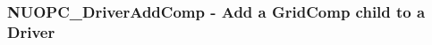  
\setlength{\oldparskip}{\parskip}
\setlength{\parskip}{1.5ex}
\setlength{\oldparindent}{\parindent}
\setlength{\parindent}{0pt}
\setlength{\oldbaselineskip}{\baselineskip}
\setlength{\baselineskip}{11pt}
 
\def\bv{\begin{verbatim}}
\def\ev{\end{verbatim}}
\def\be{\begin{equation}}
\def\ee{\end{equation}}
\def\bea{\begin{eqnarray}}
\def\eea{\end{eqnarray}}
\def\bi{\begin{itemize}}
\def\ei{\end{itemize}}
\def\bn{\begin{enumerate}}
\def\en{\end{enumerate}}
\def\bd{\begin{description}}
\def\ed{\end{description}}
\def\({\left (}
\def\){\right )}
\def\[{\left [}
\def\]{\right ]}
\def\<{\left  \langle}
\def\>{\right \rangle}
\def\cI{{\cal I}}
\def\diag{\mathop{\rm diag}}
\def\tr{\mathop{\rm tr}}


 
\subsubsection [NUOPC\_DriverAddComp] {NUOPC\_DriverAddComp - Add a GridComp child to a Driver}


